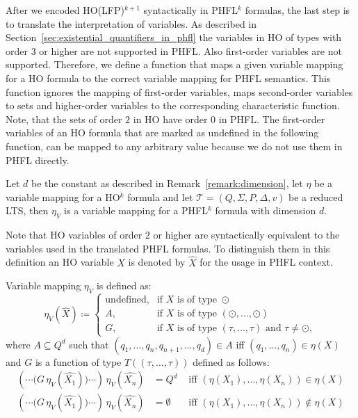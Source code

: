 After we encoded HO(LFP)$^{k+1}$ syntactically in PHFL$^k$ formulas, the last step is to translate the 
interpretation of variables. As described in Section~\ref{sec:existential_quantifiers_in_phfl} the variables in HO of 
types with order $3$ or higher are not supported in PHFL. Also first-order variables are not supported. Therefore, we 
define a function that maps a given variable mapping for a HO formula to the correct variable mapping for PHFL 
semantics. This function ignores the mapping of first-order variables, maps second-order variables to sets and 
higher-order variables to the corresponding characteristic function. Note, that the sets of order $2$ in HO have order 
$0$ in PHFL. The first-order variables of an HO formula that are marked as undefined in the following function, can be 
mapped to any arbitrary value because we do not use them in PHFL directly.

\begin{definition}
    \label{definition:lower_bound_variable_function}
    Let $d$ be the constant as described in Remark~\ref{remark:dimension}, let $\eta$ be a
    variable mapping for a HO$^k$ formula and let $\mathcal{T} = (Q, \Sigma, P, \Delta, v)$ be a reduced LTS, then $\eta_V$ is a 
    variable mapping for a PHFL$^k$ formula with dimension $d$. 
    
    Note that HO variables of order $2$ or higher are syntactically equivalent to the variables used in the translated PHFL formulas. To distinguish them in this definition an HO variable $X$ is denoted by $\hat{X}$ for the usage in PHFL context. 
    
    Variable mapping $\eta_V$ is defined as:
    \[\eta_V(\hat{X})\coloneqq
    \begin{cases}
        \text{undefined}, & \text{if } X \text{ is of type } \odot \\
        A,  & \text{if } X \text{ is of type } (\odot, \dots, \odot)\\
        G, & \text{if } X \text{ is of type } (\tau, \dots, \tau) \text{ and } \tau \neq \odot,
    \end{cases}\]
    where $A \subseteq Q^d$ such that $(q_1, \dots, q_n, q_{n + 1}, \dots, q_d) \in A$ iff $(q_1, \dots, q_n) \in
    \eta(X)$ and $G$ is a function of type $T((\tau, \dots, \tau))$ defined as follows:
    \begin{align*}
        (\dotsb\big(G\,\eta_V(\hat{X_1})\big)\dotsb)\,\eta_V(\hat{X_n}) &= Q^d &\text{ iff } (\eta(X_1), \dots, \eta(X_n)) \in \eta(X)\\
        (\dotsb\big(G\,\eta_V(\hat{X_1})\big)\dotsb)\,\eta_V(\hat{X_n}) &= \emptyset &\text{ iff } (\eta(X_1), \dots, \eta(X_n))
        \not\in \eta(X)
    \end{align*}
\end{definition}


